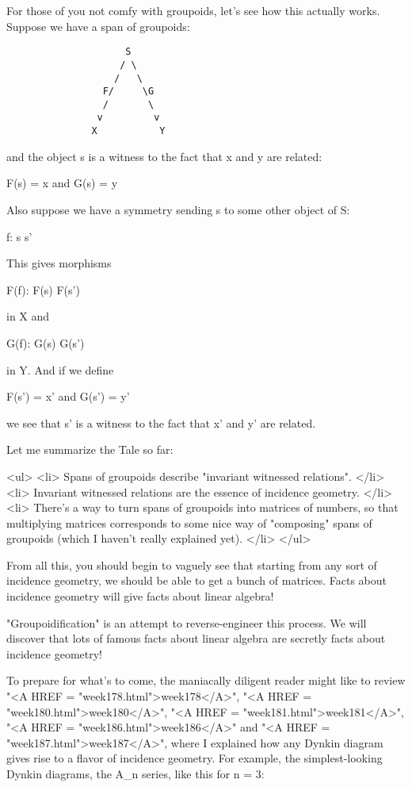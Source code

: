 For those of you not comfy with groupoids, let's see how this actually
works.  Suppose we have a span of groupoids:

\begin{verbatim}
                     S
                    / \
                   /   \
                 F/     \G
                 /       \
                v         v 
               X           Y
\end{verbatim}
    
and the object s is a witness to the fact that x and y are related:

F(s) = x and G(s) = y

Also suppose we have a symmetry sending s to some other object of S:

f: s \to  s'

This gives morphisms 

F(f): F(s) \to  F(s')

in X and 

G(f): G(s) \to  G(s')

in Y.  And if we define

F(s') = x' and G(s') = y'

we see that s' is a witness to the fact that x' and y' are related.

Let me summarize the Tale so far: 

<ul>
<li>  Spans of groupoids describe "invariant witnessed relations".
</li>
<li>
  Invariant witnessed relations are the essence of incidence geometry.
</li>
<li>
  There's a way to turn spans of groupoids into matrices of numbers,
  so that multiplying matrices corresponds to some nice way of 
  "composing" spans of groupoids (which I haven't really explained yet).
</li>
</ul>

From all this, you should begin to vaguely see that starting from any sort 
of incidence geometry, we should be able to get a bunch of matrices.
Facts about incidence geometry will give facts about linear algebra!

"Groupoidification" is an attempt to reverse-engineer this process.
We will discover that lots of famous facts about linear algebra are
secretly facts about incidence geometry!

To prepare for what's to come, the maniacally diligent reader might
like to review "<A HREF = "week178.html">week178</A>", "<A HREF = "week180.html">week180</A>", "<A HREF = "week181.html">week181</A>", "<A HREF = "week186.html">week186</A>" and "<A HREF = "week187.html">week187</A>",
where I explained how any Dynkin diagram gives rise to a flavor
of incidence geometry.  For example, the simplest-looking Dynkin
diagrams, the A_{n} series, like this for n = 3:
 
